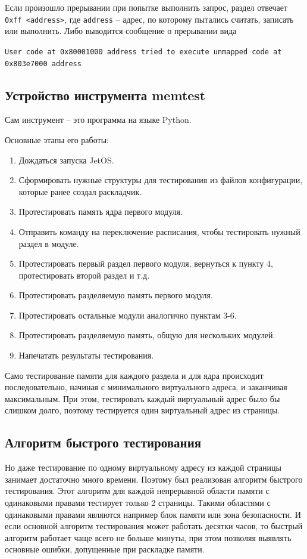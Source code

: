 \documentclass[oneside,senior,etd]{BYUPhys}
\begin{document}
Если произошло прерывании при попытке выполнить запрос, раздел отвечает \dq\texttt{0xff <address>}\dq,
где \texttt{address} -- адрес, по которому пытались считать, записать или выполнить. Либо выводится
сообщение о прерывании вида


\texttt{User code at 0x80001000 address tried to execute unmapped code at\\0x803e7000 address}


\subsection{Устройство инструмента memtest}

Сам инструмент -- это программа на языке Python.

Основные этапы его работы:
\begin{enumerate}
  \item Дождаться запуска JetOS.
  \item Сформировать нужные структуры для тестирования из файлов конфигурации, которые
  ранее создал раскладчик.
  \item Протестировать память ядра первого модуля.
  \item Отправить команду на переключение расписания, чтобы тестировать нужный раздел в модуле.
  \item Протестировать первый раздел первого модуля, вернуться к пункту 4, протестировать второй раздел и т.д.
  \item Протестировать разделяемую память первого модуля.
  \item Протестировать остальные модули аналогично пунктам 3-6.
  \item Протестировать разделяемую память, общую для нескольких модулей.
  \item Напечатать результаты тестирования.
\end{enumerate}

Само тестирование памяти для каждого раздела и для ядра происходит последовательно,
начиная с минимального виртуального адреса, и заканчивая максимальным. При этом,
тестировать каждый виртуальный адрес было бы слишком долго, поэтому тестируется
один виртуальный адрес из страницы.

\subsection{Алгоритм быстрого тестирования}

Но даже тестирование по одному виртуальному адресу из каждой страницы занимает достаточно
много времени. Поэтому был реализован алгоритм быстрого тестирования. Этот алгоритм
для каждой непрерывной области памяти с одинаковыми правами тестирует только 2 страницы.
Такими областями с одинаковыми правами являются например блок памяти или зона безопасности.
И если основной алгоритм тестирования может работать десятки часов, то быстрый алгоритм
работает чаще всего не больше минуты, при этом позволяя выявлять основные ошибки, допущенные
при раскладке памяти.
\end{document}
